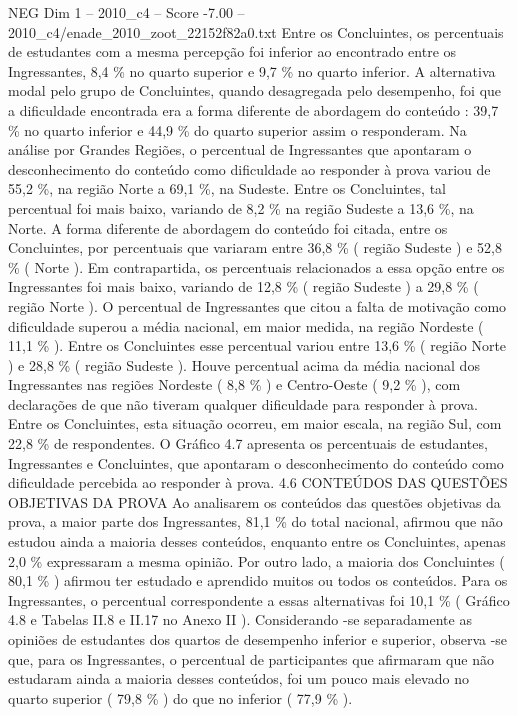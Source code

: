 \begin{textsample}{NEG Dim 1 – 2010\_c4 – Score -7.00 – 2010\_c4/enade\_2010\_zoot\_22152f82a0.txt}
Entre os Concluintes, os percentuais de estudantes com a mesma percepção foi inferior ao encontrado entre os Ingressantes, 8,4 \% no quarto superior e 9,7 \% no quarto inferior.
A alternativa modal pelo grupo de Concluintes, quando desagregada pelo desempenho, foi que a dificuldade encontrada era a forma diferente de abordagem do conteúdo : 39,7 \% no quarto inferior e 44,9 \% do quarto superior assim o responderam.
Na análise por Grandes Regiões, o percentual de Ingressantes que apontaram o desconhecimento do conteúdo como dificuldade ao responder à prova variou de 55,2 \%, na região Norte a 69,1 \%, na Sudeste.
Entre os Concluintes, tal percentual foi mais baixo, variando de 8,2 \% na região Sudeste a 13,6 \%, na Norte.
A forma diferente de abordagem do conteúdo foi citada, entre os Concluintes, por percentuais que variaram entre 36,8 \% ( região Sudeste ) e 52,8 \% ( Norte ).
Em contrapartida, os percentuais relacionados a essa opção entre os Ingressantes foi mais baixo, variando de 12,8 \% ( região Sudeste ) a 29,8 \% ( região Norte ).
O percentual de Ingressantes que citou a falta de motivação como dificuldade superou a média nacional, em maior medida, na região Nordeste ( 11,1 \% ).
Entre os Concluintes esse percentual variou entre 13,6 \% ( região Norte ) e 28,8 \% ( região Sudeste ).
Houve percentual acima da média nacional dos Ingressantes nas regiões Nordeste ( 8,8 \% ) e Centro-Oeste ( 9,2 \% ), com declarações de que não tiveram qualquer dificuldade para responder à prova.
Entre os Concluintes, esta situação ocorreu, em maior escala, na região Sul, com 22,8 \% de respondentes.
O Gráfico 4.7 apresenta os percentuais de estudantes, Ingressantes e Concluintes, que apontaram o desconhecimento do conteúdo como dificuldade percebida ao responder à prova. 4.6 CONTEÚDOS DAS QUESTÕES OBJETIVAS DA PROVA Ao analisarem os conteúdos das questões objetivas da prova, a maior parte dos Ingressantes, 81,1 \% do total nacional, afirmou que não estudou ainda a maioria desses conteúdos, enquanto entre os Concluintes, apenas 2,0 \% expressaram a mesma opinião.
Por outro lado, a maioria dos Concluintes ( 80,1 \% ) afirmou ter estudado e aprendido muitos ou todos os conteúdos.
Para os Ingressantes, o percentual correspondente a essas alternativas foi 10,1 \% ( Gráfico 4.8 e Tabelas II.8 e II.17 no Anexo II ).
Considerando -se separadamente as opiniões de estudantes dos quartos de desempenho inferior e superior, observa -se que, para os Ingressantes, o percentual de participantes que afirmaram que não estudaram ainda a maioria desses conteúdos, foi um pouco mais elevado no quarto superior ( 79,8 \% ) do que no inferior ( 77,9 \% ).

\end{textsample}
